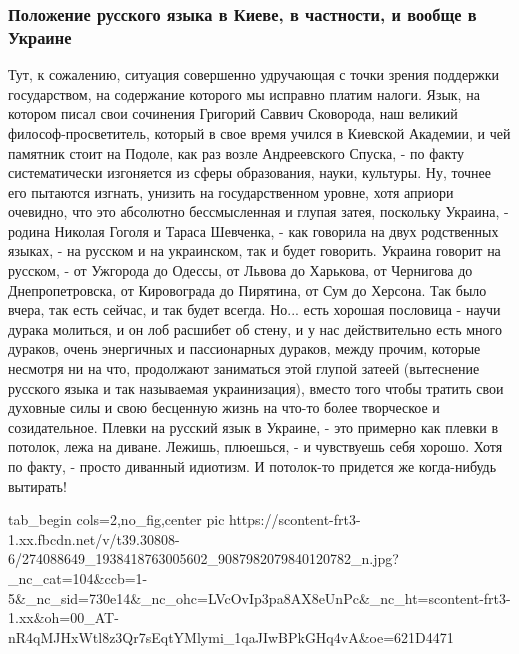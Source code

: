  
 
 
 
 

\subsubsection{Положение русского языка в Киеве, в частности, и вообще в Украине}

Тут, к сожалению, ситуация совершенно удручающая с точки зрения поддержки
государством, на содержание которого мы исправно платим налоги. Язык, на
котором писал свои сочинения Григорий Саввич Сковорода, наш великий
философ-просветитель, который в свое время учился в Киевской Академии, и чей
памятник стоит на Подоле, как раз возле Андреевского Спуска, - по факту
систематически изгоняется из сферы образования, науки, культуры. Ну, точнее его
пытаются изгнать, унизить на государственном уровне, хотя априори очевидно, что
это абсолютно бессмысленная и глупая затея, поскольку Украина, - родина Николая
Гоголя и Тараса Шевченка, - как говорила на двух родственных языках, - на
русском и на украинском, так и будет говорить. Украина говорит на русском, - от
Ужгорода до Одессы, от Львова до Харькова, от Чернигова до Днепропетровска, от
Кировограда до Пирятина, от Сум до Херсона. Так было вчера, так есть сейчас, и
так будет всегда. Но... есть хорошая пословица - научи дурака молиться, и он
лоб расшибет об стену, и у нас действительно есть много дураков, очень
энергичных и пассионарных дураков, между прочим, которые несмотря ни на что,
продолжают заниматься этой глупой затеей (вытеснение русского языка и так
называемая украинизация), вместо того чтобы тратить свои духовные силы и свою
бесценную жизнь на что-то более творческое и созидательное. Плевки на русский
язык в Украине, - это примерно как плевки в потолок, лежа на диване.  Лежишь,
плюешься, - и чувствуешь себя хорошо. Хотя по факту, - просто диванный
идиотизм. И потолок-то придется же когда-нибудь вытирать!

\ifcmt
  tab_begin cols=2,no_fig,center
     pic https://scontent-frt3-1.xx.fbcdn.net/v/t39.30808-6/274088649_1938418763005602_9087982079840120782_n.jpg?_nc_cat=104&ccb=1-5&_nc_sid=730e14&_nc_ohc=LVcOvIp3pa8AX8eUnPc&_nc_ht=scontent-frt3-1.xx&oh=00_AT-nR4qMJHxWtl8z3Qr7sEqtYMlymi_1qaJIwBPkGHq4vA&oe=621D4471

